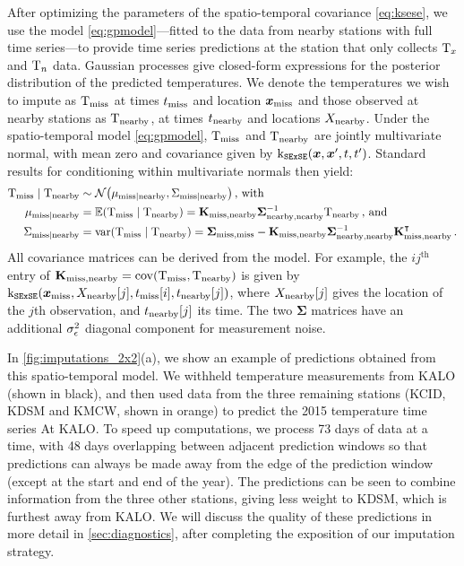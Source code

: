 \documentclass[12pt]{article}
\begin{document}
After optimizing the parameters of the spatio-temporal covariance \autoref{eq:ksese}, we use the model \autoref{eq:gpmodel}---fitted to the data from nearby stations with full time series---to provide time series predictions at the station that only collects \(\mathrm{T}_{x}\) and \(\mathrm{T}_{n}\) data.
Gaussian processes give closed-form expressions for the posterior distribution of the predicted temperatures.
We denote the temperatures we wish to impute as \(\mathrm{T}_{\mathrm{miss}}{}\) at times \(t_{\mathrm{miss}}\) and location \(\bm{x}_{\mathrm{miss}}\) and those observed at nearby stations as \(\mathrm{T}_{\mathrm{nearby}}{}\), at times \(t_{\mathrm{nearby}}\) and locations \(X_{\mathrm{nearby}}\).
Under the spatio-temporal model \autoref{eq:gpmodel}, \(\mathrm{T}_{\mathrm{miss}}\) and \(\mathrm{T}_{\mathrm{nearby}}\) are jointly multivariate normal, with mean zero and covariance given by \(\operatorname{k_{\mathtt{SExSE}}}(\bm{x},\bm{x}',t,t')\).
Standard results for conditioning within multivariate normals then yield:
\begin{equation}
\begin{split}
    \T_\miss \mid \T_\obs &\sim \normal\del{\mu_{\miss \mid \obs}, \Sigma_{\miss \mid \obs}}\,\text{, with} \\
    \mu_{\miss \mid \obs} &= \E \del{\T_\miss \mid \T_\obs} = \Kmo \Soo^{-1} \T_\obs \,\text{, and} \\
    \Sigma_{\miss \mid \obs} &= \var \del{\T_\miss \mid \T_\obs} = \Smm - \Kmo \Soo^{-1} \Kmo\trans
    \,.
\end{split}
\label{eq:unconstrained_post}
\end{equation}
All covariance matrices can be derived from the model.
For example, the \(ij^{\text{th}}\) entry of \(\Kmo = \cov\del{\T_\miss, \T_\obs}\) is given by \(\kSESE(\xvec_\miss,X_\obs\sbr{j},t_\miss\sbr{i},t_\obs\sbr{j})\), where \(X_\obs\sbr{j}\) gives the location of the \(j\)th observation, and \(t_\obs\sbr{j}\) its time.
The two \(\mathbold{\Sigma}\) matrices have an additional \(\sigma_{\epsilon}^2\) diagonal component for measurement noise.

In \autoref{fig:imputations_2x2}(a), we show an example of predictions obtained from this spatio-temporal model. 
We withheld temperature measurements from KALO (shown in black), and then used data from the three remaining stations (KCID, KDSM and KMCW, shown in orange) to predict the 2015 temperature time series At KALO.
To speed up computations, we process 73 days of data at a time, with 48 days overlapping between adjacent prediction windows so that predictions can always be made away from the edge of the prediction window (except at the start and end of the year).
The predictions can be seen to combine information from the three other stations, giving less weight to KDSM, which is furthest away from KALO.
We will discuss the quality of these predictions in more detail in \autoref{sec:diagnostics}, after completing the exposition of our imputation strategy.
\end{document}
